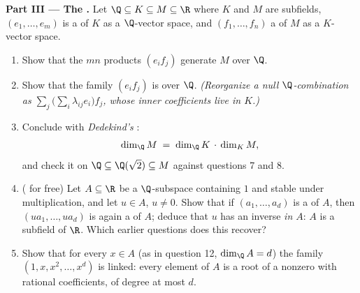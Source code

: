 \begin{problem}
\medskip
\noindent\textbf{Part III --- The .} Let $\Q \subseteq K
\subseteq M \subseteq \R$ where $K$ and $M$ are subfields, $(e_1,
\dots, e_m)$ is a  of $K$ as a $\Q$-vector space, and $(f_1,
\dots, f_n)$ a  of $M$ as a $K$-vector space.
\begin{enumerate}[resume]
  \item Show that the $mn$ products $(e_i f_j)$ generate $M$ over
        $\Q$.
  \item Show that the family $(e_i f_j)$ is  over $\Q$.
        \emph{(Reorganize a null $\Q$-combination as $\sum_j
        \bigl(\sum_i \lambda_{ij} e_i\bigr) f_j$, whose inner
        coefficients live in $K$.)}
  \item Conclude with \emph{Dedekind's }:
        \[
        \dim_\Q M \;=\; \dim_\Q K \,\cdot\, \dim_K M ,
        \]
        and check it on $\Q \subseteq \Q(\sqrt2) \subseteq M$
        against questions 7 and 8.
  \item ( for free) Let $A \subseteq \R$ be a
         $\Q$-subspace containing $1$ and
        stable under multiplication, and let $u \in A$, $u \neq
        0$. Show that if $(a_1, \dots, a_d)$ is a  of $A$,
        then $(u a_1, \dots, u a_d)$ is again a  of $A$;
        deduce that $u$ has an inverse \emph{in $A$}: $A$ is a
        subfield of $\R$. Which earlier questions does this
        recover?
  \item Show that for every $x \in A$ (as in question 12, $\dim_\Q
        A = d$) the family $(1, x, x^2, \dots, x^{d})$ is linked:
        every element of $A$ is a root of a nonzero 
        with rational coefficients, of degree at most $d$.
\end{enumerate}


\end{problem}
